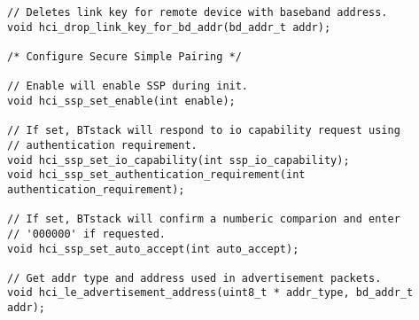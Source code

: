 \begin{lstlisting}
// Deletes link key for remote device with baseband address.
void hci_drop_link_key_for_bd_addr(bd_addr_t addr);

/* Configure Secure Simple Pairing */

// Enable will enable SSP during init.
void hci_ssp_set_enable(int enable);

// If set, BTstack will respond to io capability request using 
// authentication requirement.
void hci_ssp_set_io_capability(int ssp_io_capability);
void hci_ssp_set_authentication_requirement(int authentication_requirement);

// If set, BTstack will confirm a numberic comparion and enter
// '000000' if requested.
void hci_ssp_set_auto_accept(int auto_accept);

// Get addr type and address used in advertisement packets.
void hci_le_advertisement_address(uint8_t * addr_type, bd_addr_t addr);
\end{lstlisting}
\pagebreak
